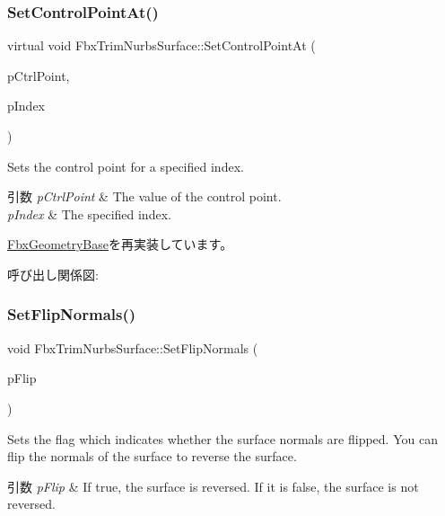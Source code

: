 \subsubsection{\texorpdfstring{Set\+Control\+Point\+At()}{SetControlPointAt()}\hspace{0.1cm}{\footnotesize\ttfamily [2/2]}}
{\footnotesize\ttfamily virtual void Fbx\+Trim\+Nurbs\+Surface\+::\+Set\+Control\+Point\+At (\begin{DoxyParamCaption}\item[{const \hyperlink{class_fbx_vector4}{Fbx\+Vector4} \&}]{p\+Ctrl\+Point,  }\item[{int}]{p\+Index }\end{DoxyParamCaption})\hspace{0.3cm}{\ttfamily [virtual]}}

Sets the control point for a specified index. 
\begin{DoxyParams}{引数}
{\em p\+Ctrl\+Point} & The value of the control point. \\
\hline
{\em p\+Index} & The specified index. \\
\hline
\end{DoxyParams}


\hyperlink{class_fbx_geometry_base_ab2d5567b073e6b9f4feb5bb428fa99e4}{Fbx\+Geometry\+Base}を再実装しています。

呼び出し関係図\+:
\mbox{\label{class_fbx_trim_nurbs_surface_a5f73a1d5abe4f71741ddc82fb7d003c8}} 
\subsubsection{\texorpdfstring{Set\+Flip\+Normals()}{SetFlipNormals()}}
{\footnotesize\ttfamily void Fbx\+Trim\+Nurbs\+Surface\+::\+Set\+Flip\+Normals (\begin{DoxyParamCaption}\item[{bool}]{p\+Flip }\end{DoxyParamCaption})}

Sets the flag which indicates whether the surface normals are flipped. You can flip the normals of the surface to reverse the surface. 
\begin{DoxyParams}{引数}
{\em p\+Flip} & If {\ttfamily true}, the surface is reversed. If it is false, the surface is not reversed. \\
\hline
\end{DoxyParams}
\mbox{\label{class_fbx_trim_nurbs_surface_ab255a3f5402aa8adb8d834af524ac291}} 
